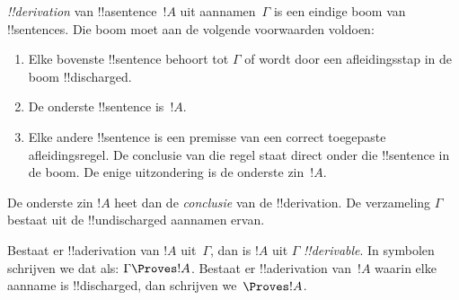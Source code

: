 \documentclass[openany]{memoir}
\begin{document}
\begin{defn}[!!^{derivation}]
 \emph{!!{derivation}} van !!a{sentence}~$!A$ uit
aannamen~$\Gamma$ is een eindige boom van !!{sentence}s. Die boom moet
aan de volgende voorwaarden voldoen:
\begin{enumerate}
\item Elke bovenste !!{sentence} behoort tot $\Gamma$ of wordt door een
  afleidingsstap in de boom !!{discharged}.
\item De onderste !!{sentence} is~$!A$.
\item Elke andere !!{sentence} is een premisse van een correct
  toegepaste afleidingsregel. De conclusie van die regel staat direct
  onder die !!{sentence} in de boom. De enige uitzondering is de
  onderste zin~$!A$.
\end{enumerate}
De onderste zin $!A$ heet dan de \emph{conclusie} van de
!!{derivation}. De verzameling $\Gamma$ bestaat uit de
!!{undischarged} aannamen ervan.

Bestaat er !!a{derivation} van $!A$ uit~$\Gamma$, dan is $!A$ uit
$\Gamma$ \emph{!!{derivable}}. In symbolen schrijven we dat als:
$\Gamma \Proves !A$. Bestaat er !!a{derivation} van~$!A$ waarin elke
aanname is !!{discharged}, dan schrijven we~$\Proves !A$.
\end{defn}
\end{document}
